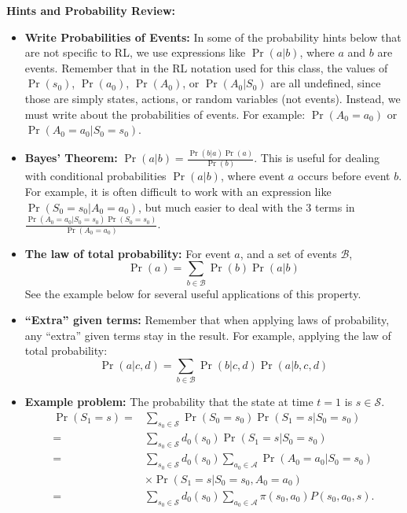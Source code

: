 \documentclass[]{article}
\begin{document}
\begin{enumerate}
    \textbf{Hints and Probability Review:}
    \begin{itemize}
        \item \textbf{Write Probabilities of Events:} In some of the probability hints below that are not specific to RL, we use expressions like $\Pr(a|b)$, where $a$ and $b$ are events.  Remember that in the RL notation used for this class, the values of $\Pr(s_0)$, $\Pr(a_0)$, $\Pr(A_0)$, or $\Pr(A_0 | S_0)$ are all undefined, since those are simply states, actions, or random variables (not events).  Instead, we must write about the probabilities of events.  For example: $\Pr(A_0 = a_0)$ or $\Pr(A_0 = a_0 | S_0 = s_0)$.
        \item \textbf{Bayes' Theorem:} $\Pr(a|b) = \frac{\Pr(b|a) \Pr(a)}{\Pr(b)}$. This is useful for dealing with conditional probabilities $\Pr(a|b)$, where event $a$ occurs before event $b$.  For example, it is often difficult to work with an expression like $\Pr(S_0 = s_0 | A_0 = a_0)$, but much easier to deal with the 3 terms in $\frac{\Pr(A_0 = a_0 | S_0 = s_0) \Pr(S_0 = s_0)}{\Pr(A_0 = a_0)}$.
        \item \textbf{The law of total probability:} For event $a$, and a set of events $\mathcal{B}$,
        $$\Pr(a) = \sum_{b \in \mathcal B} \Pr(b) \Pr(a|b)$$ See the example below for several useful applications of this property.
        \item \textbf{``Extra'' given terms:} Remember that when applying laws of probability, any ``extra'' given terms stay in the result.  For example, applying the law of total probability: $$\Pr(a|c,d) = \sum_{b \in \mathcal B} \Pr(b|c,d) \Pr(a|b,c,d)$$
        \item \textbf{Example problem:} The probability that the state at time $t = 1$ is $s \in \mathcal S$. 
        \begin{align}
        \Pr(S_1 = s) =& \sum_{s_0 \in \mathcal S} \Pr(S_0 = s_0) \Pr(S_1 = s | S_0 = s_0) \\
        =& \sum_{s_0\in \mathcal S} d_0(s_0) \Pr(S_1 = s | S_0 = s_0)\\
        =& \sum_{s_0\in \mathcal S} d_0(s_0) \sum_{a_0\in \mathcal A} \Pr(A_0 = a_0 | S_0 = s_0)\\
        &\times \Pr(S_1 = s | S_0 = s_0, A_0 = a_0)\\
        =& \sum_{s_0\in \mathcal S} d_0(s_0) \sum_{a_0\in \mathcal A} \pi(s_0, a_0) P(s_0, a_0, s).
        \end{align}

\end{itemize}
\end{enumerate}
\end{document}
